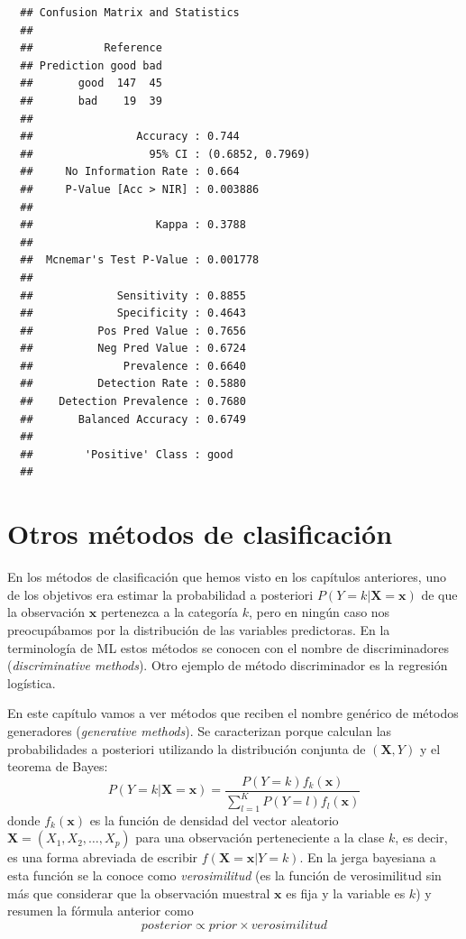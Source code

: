 \documentclass[
]{book}
\theoremstyle{break}
\theoremstyle{nonumberplain}
\begin{document}
\begin{verbatim}
  ## Confusion Matrix and Statistics
  ## 
  ##           Reference
  ## Prediction good bad
  ##       good  147  45
  ##       bad    19  39
  ##                                           
  ##                Accuracy : 0.744           
  ##                  95% CI : (0.6852, 0.7969)
  ##     No Information Rate : 0.664           
  ##     P-Value [Acc > NIR] : 0.003886        
  ##                                           
  ##                   Kappa : 0.3788          
  ##                                           
  ##  Mcnemar's Test P-Value : 0.001778        
  ##                                           
  ##             Sensitivity : 0.8855          
  ##             Specificity : 0.4643          
  ##          Pos Pred Value : 0.7656          
  ##          Neg Pred Value : 0.6724          
  ##              Prevalence : 0.6640          
  ##          Detection Rate : 0.5880          
  ##    Detection Prevalence : 0.7680          
  ##       Balanced Accuracy : 0.6749          
  ##                                           
  ##        'Positive' Class : good            
  ## 
\end{verbatim}

\hypertarget{class-otros}{%
\chapter{Otros métodos de clasificación}\label{class-otros}}

En los métodos de clasificación que hemos visto en los capítulos anteriores, uno de los objetivos era estimar la probabilidad a posteriori \(P(Y = k | \mathbf{X}=\mathbf{x})\) de que la observación \(\mathbf{x}\) pertenezca a la categoría \(k\), pero en ningún caso nos preocupábamos por la distribución de las variables predictoras. En la terminología de ML estos métodos se conocen con el nombre de discriminadores (\emph{discriminative methods}). Otro ejemplo de método discriminador es la regresión logística.

En este capítulo vamos a ver métodos que reciben el nombre genérico de métodos generadores (\emph{generative methods}). Se caracterizan porque calculan las probabilidades a posteriori utilizando la distribución conjunta de \((\mathbf{X}, Y)\) y el teorema de Bayes:
\[P(Y = k | \mathbf{X}=\mathbf{x}) = \frac{P(Y = k) f_k(\mathbf{x})}{\sum_{l=1}^K P(Y = l) f_l(\mathbf{x})}\]
donde \(f_k(\mathbf{x})\) es la función de densidad del vector aleatorio \(\mathbf{X}=(X_1, X_2, \ldots, X_p)\) para una observación perteneciente a la clase \(k\), es decir, es una forma abreviada de escribir \(f(\mathbf{X}=\mathbf{x} | Y = k)\). En la jerga bayesiana a esta función se la conoce como \emph{verosimilitud} (es la función de verosimilitud sin más que considerar que la observación muestral \(\mathbf{x}\) es fija y la variable es \(k\)) y resumen la fórmula anterior como
\[posterior \propto prior \times verosimilitud\]
\end{document}
